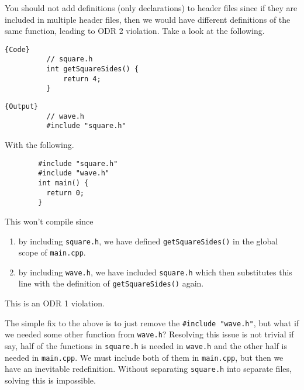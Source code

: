\documentclass{article}
\begin{document}
    \begin{example}
      You should not add definitions (only declarations) to header files since if they are included in multiple header files, then we would have different definitions of the same function, leading to ODR 2 violation. Take a look at the following. 
      
      \noindent\begin{minipage}{.5\textwidth}
        \begin{lstlisting}[]{Code}
          // square.h
          int getSquareSides() {
              return 4;
          } 
        \end{lstlisting}
        \end{minipage}
        \hfill
        \begin{minipage}{.49\textwidth}
        \begin{lstlisting}[]{Output}
          // wave.h 
          #include "square.h"
        \end{lstlisting}
      \end{minipage}

      With the following. 
      \begin{lstlisting}
        #include "square.h"
        #include "wave.h" 
        int main() {
          return 0;
        }
      \end{lstlisting}
      This won't compile since 
      \begin{enumerate}
        \item by including \texttt{square.h}, we have defined \texttt{getSquareSides()} in the global scope of \texttt{main.cpp}. 
        \item by including \texttt{wave.h}, we have included \texttt{square.h} which then substitutes this line with the definition of \texttt{getSquareSides()} again. 
      \end{enumerate}
      This is an ODR 1 violation. 
    \end{example} 

    The simple fix to the above is to just remove the \texttt{\#include "wave.h"}, but what if we needed some other function from \texttt{wave.h}? Resolving this issue is not trivial if say, half of the functions in \texttt{square.h} is needed in \texttt{wave.h} and the other half is needed in \texttt{main.cpp}. We must include both of them in \texttt{main.cpp}, but then we have an inevitable redefinition. Without separating \texttt{square.h} into separate files, solving this is impossible. 
\end{document}
